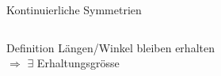 \begin{frame}[t]
\begin{columns}[t,onlytextwidth]
\begin{column}{0.48\textwidth}
\begin{block}{Kontinuierliche Symmetrien}
\begin{itemize}
\[\]
\end{itemize}
\end{block}
\vspace{-10pt}
\begin{block}{Definition}
Längen/Winkel bleiben erhalten
\\
$\Rightarrow$ $\exists$ Erhaltungsgrösse
\end{block}
\end{column}
\end{columns}
\end{frame}
\egroup
